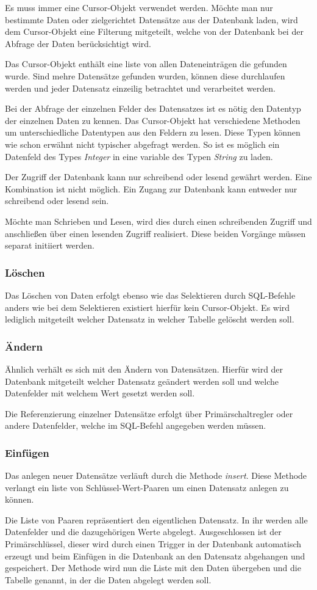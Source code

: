 Es muss immer eine Cursor-Objekt verwendet werden. Möchte man nur bestimmte Daten oder zielgerichtet Datensätze aus der Datenbank laden, wird dem Cursor-Objekt eine Filterung mitgeteilt, welche von der Datenbank bei der Abfrage der Daten berücksichtigt wird.

Das Cursor-Objekt enthält eine liste von allen Dateneinträgen die gefunden wurde. Sind mehre Datensätze gefunden wurden, können diese durchlaufen werden und jeder Datensatz einzeilig betrachtet und verarbeitet werden.

Bei der Abfrage der einzelnen Felder des Datensatzes ist es nötig den Datentyp der einzelnen Daten zu kennen. Das Cursor-Objekt hat verschiedene Methoden um unterschiedliche Datentypen aus den Feldern zu lesen. Diese Typen können wie schon erwähnt nicht typischer abgefragt werden. So ist es möglich ein Datenfeld des Types \textit{Integer} in eine variable des Typen \textit{String} zu laden.

Der Zugriff der Datenbank kann nur schreibend oder lesend gewährt werden. Eine Kombination ist nicht möglich. Ein Zugang zur Datenbank kann entweder nur schreibend oder lesend sein.

Möchte man Schrieben und Lesen, wird dies durch einen schreibenden Zugriff und anschließen über einen lesenden Zugriff realisiert. Diese beiden Vorgänge müssen separat initiiert werden.

\subsubsection{Löschen}
Das Löschen von Daten erfolgt ebenso wie das Selektieren durch SQL-Befehle anders wie bei dem Selektieren existiert hierfür kein Cursor-Objekt. Es wird lediglich mitgeteilt welcher Datensatz in welcher Tabelle gelöscht werden soll.

\subsubsection{Ändern}
Ähnlich verhält es sich mit den Ändern von Datensätzen. Hierfür wird der Datenbank mitgeteilt welcher Datensatz geändert werden soll und welche Datenfelder mit welchem Wert gesetzt werden soll.

Die Referenzierung einzelner Datensätze erfolgt über Primärschaltregler oder andere Datenfelder, welche im SQL-Befehl angegeben werden müssen.

\subsubsection{Einfügen}
Das anlegen neuer Datensätze verläuft durch die Methode \textit{insert}. Diese Methode verlangt ein liste von Schlüssel-Wert-Paaren um einen Datensatz anlegen zu können.

Die Liste von Paaren repräsentiert den eigentlichen Datensatz. In ihr werden alle Datenfelder und die dazugehörigen Werte abgelegt. Ausgeschlossen ist der Primärschlüssel, dieser wird durch einen Trigger in der Datenbank automatisch erzeugt und beim Einfügen in die Datenbank an den Datensatz abgehangen und gespeichert. Der Methode wird nun die Liste mit den Daten übergeben und die Tabelle genannt, in der die Daten abgelegt werden soll.

